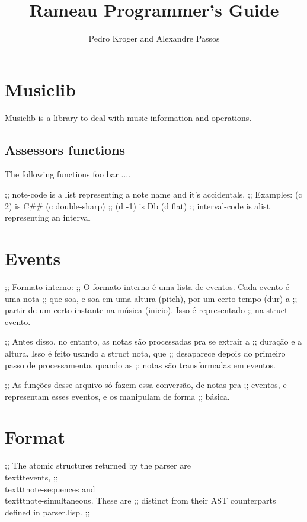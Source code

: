 \documentclass{article}
\title{Rameau Programmer's Guide}
\author{Pedro Kroger and Alexandre Passos}
\begin{document}
\maketitle

\section{Musiclib}
\label{sec:musiclib}

Musiclib is a library to deal with music information and operations.

\subsection{Assessors functions}
\label{sec:accessors-functions}

The following functions foo bar ....

;; note-code is a list representing a note name and it's accidentals.
;;   Examples: (c 2)  is C## (c double-sharp)
;;             (d -1) is Db (d flat)
;; interval-code is alist representing an interval


\section{Events}
\label{sec:events}

;; Formato interno:
;; O formato interno é uma lista de eventos. Cada evento é uma nota
;; que soa, e soa em uma altura (pitch), por um certo tempo (dur) a
;; partir de um certo instante na música (inicio). Isso é representado
;; na struct evento.

;; Antes disso, no entanto, as notas são processadas pra se extrair a
;; duração e a altura. Isso é feito usando a struct nota, que
;; desaparece depois do primeiro passo de processamento, quando as
;; notas são transformadas em eventos.

;; As funções desse arquivo só fazem essa conversão, de notas pra
;; eventos, e representam esses eventos, e os manipulam de forma
;; básica.




\section{Format}
\label{sec:format}

;; The atomic structures returned by the parser are \\texttt{event}s,
;; \\texttt{note-sequence}s and \\texttt{note-simultaneous}. These are
;; distinct from their AST counterparts defined in parser.lisp.
;;
\end{document}
